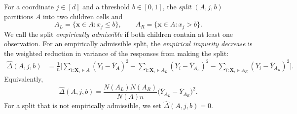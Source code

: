 \documentclass[11pt]{article}
\theoremstyle{plain}
\theoremstyle{definition}
\theoremstyle{remark}
\theoremstyle{plain}
\newcommand{\bx}{\mathbf{x}}
\newcommand{\bX}{\mathbf{X}}
\newcommand{\1}{\mathbbm{1}}
\begin{document}
For a coordinate $j\in[d]$ and a threshold $b\in[0,1]$, the \emph{split} $(A,j,b)$ partitions $A$ into two children cells and
\[
A_L=\{\bx\in A:x_j\le b\},
\qquad
A_R=\{\bx\in A:x_j>b\}.
\]
We call the split \emph{empirically admissible} if both children contain
at least one observation.
For an empirically admissible split, the \emph{empirical impurity decrease}
is the weighted reduction in variance of the responses from making the split:
\begin{align}
\label{eq:empirical-impurity-decrease}
\widehat\Delta(A,j,b)
&=
\frac{1}{n}\biggl[
\sum_{i:\bX_i\in A}(Y_i-\overline Y_A)^2
-
\sum_{i:\bX_i\in A_L}(Y_i-\overline Y_{A_L})^2
-
\sum_{i:\bX_i\in A_R}(Y_i-\overline Y_{A_R})^2
\biggr].
\end{align}
Equivalently,
\[
\widehat\Delta(A,j,b)
=
\frac{N(A_L)N(A_R)}{N(A)n}
\bigl(\overline Y_{A_L}-\overline Y_{A_R}\bigr)^2.
\]
For a split that is not empirically admissible, we set
$\widehat\Delta(A,j,b)=0$.
\end{document}
